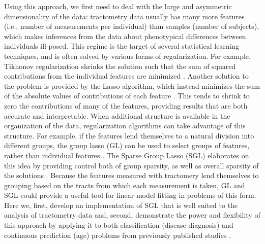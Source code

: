 Using this approach, we first need to deal with the large and
asymmetric dimensionality of the data: tractometry data usually has
many more features (i.e., number of measurements per individual) than
samples (number of subjects), which makes inferences from the data
about phenotypical differences between individuals ill-posed. This
regime is the target of several statistical learning techniques, and
is often solved by various forms of regularization. For example,
Tikhonov regularization shrinks the solution such that the sum of
squared contributions from the individual features are minimized
\cite{Hoerl2000-ij}. Another solution to the problem is provided by
the Lasso algorithm, which instead minimizes the sum of the absolute
values of contributions of each feature \cite{Tibshirani1996-qs}. This
tends to shrink to zero the contributions of many of the features,
providing results that are both accurate and interpretable. When
additional structure is available in the organization of the data,
regularization algorithms can take advantage of this structure. For
example, if the features lend themselves to a natural division into
different groups, the group lasso (GL) can be used to select groups
of features, rather than individual features \cite{Yuan2006-ky}.
The Sparse Group Lasso (SGL) elaborates on this idea by providing
control both of group sparsity, as well as overall sparsity of the
solutions \cite{simon2013sgl}. Because the features measured with
tractomery lend themselves to grouping based on the tracts from which
each measurement is taken, GL and SGL could provide a useful tool
for linear model fitting in problems of this form. Here we, first,
develop an implementation of SGL that is well suited to the analysis of
tractometry data and, second, demonstrate the power and flexibility of
this approach by applying it to both classification (disease diagnosis)
and continuous prediction (age) problems from previously published
studies \cite{sarica2017corticospinal, yeatman2014lifespan}.
